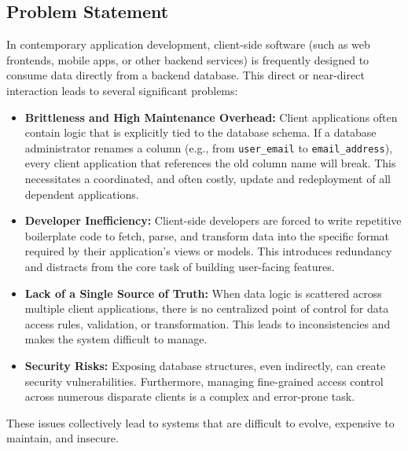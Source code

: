 \documentclass[12pt, a4paper]{report}
\begin{document}
\subsection{Problem Statement}
In contemporary application development, client-side software (such as web frontends, mobile apps, or other backend services) is frequently designed to consume data directly from a backend database. This direct or near-direct interaction leads to several significant problems:
\begin{itemize}
    \item \textbf{Brittleness and High Maintenance Overhead:} Client applications often contain logic that is explicitly tied to the database schema. If a database administrator renames a column (e.g., from \lstinline!user_email! to \lstinline!email_address!), every client application that references the old column name will break. This necessitates a coordinated, and often costly, update and redeployment of all dependent applications.
    \item \textbf{Developer Inefficiency:} Client-side developers are forced to write repetitive boilerplate code to fetch, parse, and transform data into the specific format required by their application's views or models. This introduces redundancy and distracts from the core task of building user-facing features.
    \item \textbf{Lack of a Single Source of Truth:} When data logic is scattered across multiple client applications, there is no centralized point of control for data access rules, validation, or transformation. This leads to inconsistencies and makes the system difficult to manage.
    \item \textbf{Security Risks:} Exposing database structures, even indirectly, can create security vulnerabilities. Furthermore, managing fine-grained access control across numerous disparate clients is a complex and error-prone task.
\end{itemize}
These issues collectively lead to systems that are difficult to evolve, expensive to maintain, and insecure.
\end{document}
